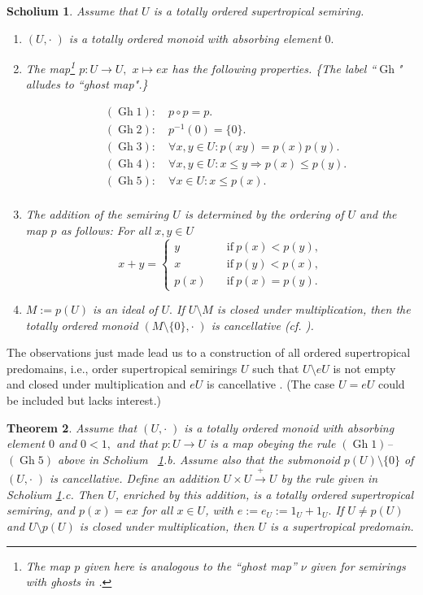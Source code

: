 \documentclass [12pt,a4paper,reqno]{amsart}
\newtheorem{thm}{Theorem} [section]
\newtheorem{schol}[thm]{Scholium}
\begin{document}
\begin{schol}\label{schol3.2}
Assume that $U$ is a totally ordered supertropical semiring.
\begin{enumerate}
\item[a)] $(U,\cdot \; )$ is a totally ordered monoid with absorbing
element $0.$ \item[b)] The map\footnote{The map $p$ given here is
analogous to the ``ghost map'' $\nu$ given for semirings with
ghosts in \cite{IzhakianRowen2007SuperTropical}.} $p:U\to U,$
$x\mapsto ex$ has the following properties. \{The label ``${\operatorname{Gh}}$"
alludes to ``ghost map".\}

\begin{align*}
& ({\operatorname{Gh}}1): \quad   p\circ p=p.  \\
& ({\operatorname{Gh}}2): \quad   p^{-1}(0)=\{0\}.  \\
& ({\operatorname{Gh}}3): \quad   \forall x,y\in U: p(xy)=p(x)p(y).  \\
& ({\operatorname{Gh}}4): \quad  \forall x,y\in U: x\le y\Rightarrow p(x)\le p(y).  \\
& ({\operatorname{Gh}}5): \quad   \forall x\in U: x\le p(x).  \\
\end{align*}
 \item[c)] The
addition of the semiring $U$ is determined by the ordering of $U$
and the  map $p$ as follows: For all $x,y \in  U$
$$x+y=\begin{cases} y &\quad \text{if}\ p(x)<p(y),\\
x&\quad \text{if}\ p(y)<p(x),\\
p(x) &\quad \text{if}\ p(x)=p(y).\end{cases}$$
 \item[d)]$M:=p(U)$ is an ideal of $U.$ If $U\setminus M$ is
 closed under multiplication, then the totally ordered monoid
 $(M\setminus\{0\},\cdot \; )$ is cancellative (cf. \cite[Proposition
 3.13]{IKR1}).
\end{enumerate}
\end{schol}
The  observations just made lead us
to a construction of all ordered supertropical predomains,  i.e.,
order supertropical semirings $U$ such that $U\setminus eU$ is not
empty and closed under multiplication and $eU$ is cancellative
\cite[Definition 3.14]{IKR1}. (The case $U=eU$ could be included
but lacks interest.)

\begin{thm}\label{thm3.3}
Assume that $(U,\cdot \; )$ is a totally ordered monoid with
absorbing element $0$ and $0<1,$ and that $p:U\to U$ is a map
obeying the rule {\rm $({\operatorname{Gh}}1)$--$({\operatorname{Gh}}5)$} above in Scholium~
\ref{schol3.2}.b. Assume also that the submonoid
$p(U)\setminus\{0\}$ of $(U,\cdot \; )$ is cancellative. Define an
addition $U\times U\overset +\rightarrow U$ by the rule given in
Scholium \ref{schol3.2}.c. Then $U$, enriched by this addition, is
a totally ordered supertropical semiring, and $p(x)=ex$ for all
$x\in U$, with $e:=e_U:=1_U+1_U.$ If $U\ne p(U)$ and $U\setminus
p(U)$ is closed under multiplication, then $U$ is a supertropical
predomain.
\end{thm}
\end{document}
